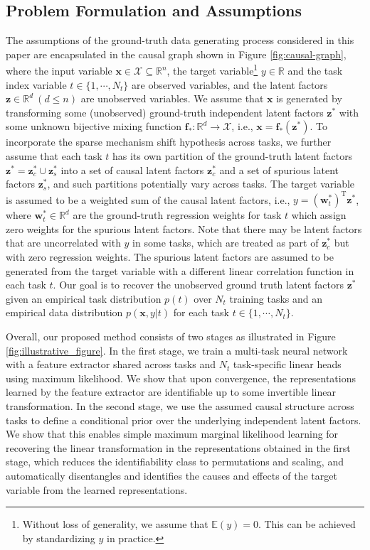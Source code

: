 \documentclass{article} %
\theoremstyle{plain}
\theoremstyle{definition}
\theoremstyle{remark}
\begin{document}
\subsection{Problem Formulation and Assumptions}
\vspace{-1ex}
The assumptions of the ground-truth data generating process considered in this paper are encapsulated in the causal graph shown in Figure \ref{fig:causal-graph}, where the input variable $\mathbf{x}\in\mathcal{X}\subseteq\mathbb{R}^n$, the target variable\footnote{Without loss of generality, we assume that $\mathbb{E}(y)=0$. This can be achieved by standardizing $y$ in practice.} $y\in\mathbb{R}$ and the task index variable $t\in\{1,\cdots,N_t\}$ are observed variables, and the latent factors $\mathbf{z}\in\mathbb{R}^d~(d\leq n)$ are unobserved variables. We assume that $\mathbf{x}$ is generated by transforming some (unobserved) ground-truth independent latent factors $\mathbf{z}^*$ with some unknown bijective mixing function $\mathbf{f}_*:\mathbb{R}^d\to\mathcal{X}$, i.e., $\mathbf{x}=\mathbf{f}_*(\mathbf{z^*})$. To incorporate the sparse mechanism shift hypothesis across tasks, we further assume that each task $t$ has its own partition of the ground-truth latent factors $\mathbf{z}^*=\mathbf{z}_c^*\cup\mathbf{z}_s^*$ into a set of causal latent factors $\mathbf{z}_c^*$ and a set of spurious latent factors $\mathbf{z}_s^*$, and such partitions potentially vary across tasks. The target variable is assumed to be a weighted sum of the causal latent factors, i.e., $y=(\mathbf{w}_t^*)^{\text{T}}\mathbf{z}^*$, where $\mathbf{w}_t^*\in\mathbb{R}^d$ are the ground-truth regression weights for task $t$ which assign zero weights for the spurious latent factors. Note that there may be latent factors that are uncorrelated with $y$ in some
tasks, which are treated as part of $\mathbf{z}_c^*$ but with zero regression weights. The spurious latent factors are assumed to be generated from the target variable with a different linear correlation function in each task $t$. Our goal is to recover the unobserved ground truth latent factors $\mathbf{z}^*$ given an empirical task distribution $p(t)$ over $N_t$ training tasks and an empirical data distribution $p(\mathbf{x},y|t)$ for each task $t\in\{1,\cdots,N_t\}$. 

Overall, our proposed method consists of two stages as illustrated in Figure \ref{fig:illustrative_figure}. In the first stage, we train a multi-task neural network with a feature extractor shared across tasks and $N_t$ task-specific linear heads using maximum likelihood. We show that upon convergence, the representations learned by the feature extractor are identifiable up to some invertible linear transformation. In the second stage, we use the assumed causal structure across tasks to define a conditional prior over the underlying independent latent factors. We show that this enables simple maximum marginal likelihood learning for recovering the linear transformation in the representations obtained in the first stage, which reduces the identifiability class to permutations and scaling, and automatically disentangles and identifies the causes and effects of the target variable from the learned representations. 
\end{document}
